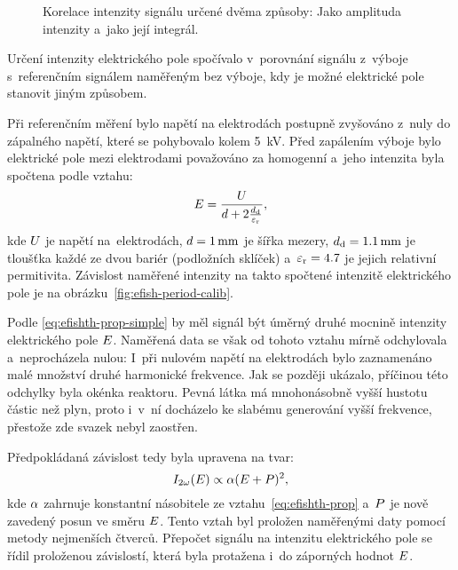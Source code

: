 \begin{figure}[htp]
	\centering
	
	\caption{Korelace intenzity signálu \EFISH{} určené dvěma způsoby:
		Jako amplituda intenzity a~jako její integrál.}
	\label{fig:efish-intmax}
\end{figure}

Určení intenzity elektrického pole spočívalo v~porovnání signálu
\EFISH{} z~výboje s~referenčním signálem naměřeným bez výboje,
kdy je možné elektrické pole stanovit jiným způsobem.

Při referenčním měření bylo napětí na elektrodách postupně zvyšováno
z~nuly do zápalného napětí, které se pohybovalo kolem \SI{5}{\kilo\volt}.
Před zapálením výboje bylo elektrické pole mezi elektrodami považováno
za homogenní a~jeho intenzita byla spočtena podle vztahu:
\begin{equation}
	E = \frac{U}
		{d + 2\frac{d_\text{d}}{\varepsilon_\text{r}}},
\end{equation}
kde $U$ je napětí na~elektrodách,
$d = \SI{1}{\milli\metre}$ je šířka mezery,
$d_\text{d} = \SI{1.1}{\milli\metre}$ je tloušťka každé ze dvou bariér
(podložních sklíček)
a~$\varepsilon_\text{r} = \num{4.7}$ je jejich relativní permitivita.
Závislost naměřené intenzity na takto spočtené intenzitě elektrického
pole je na obrázku~\ref{fig:efish-period-calib}.

Podle \eqref{eq:efishth-prop-simple} by měl signál \EFISH{} být úměrný
druhé mocnině intenzity elektrického pole $E$.
Naměřená data se však od tohoto vztahu mírně odchylovala a~neprocházela nulou:
I~při nulovém napětí na elektrodách bylo zaznamenáno malé množství
druhé harmonické frekvence.
Jak se později ukázalo, příčinou této odchylky byla okénka reaktoru.
Pevná látka má mnohonásobně vyšší hustotu částic než plyn,
proto i~v~ní docházelo ke slabému generování vyšší frekvence,
přestože zde svazek nebyl zaostřen.

Předpokládaná závislost tedy byla upravena na tvar:
\begin{equation}
	\label{eq:efish-prop}
	I_{2\omega}(E) \propto \alpha (E + P)^2,
\end{equation}
kde $\alpha$ zahrnuje konstantní násobitele
ze vztahu~\eqref{eq:efishth-prop}
a~$P$ je nově zavedený posun ve směru $E$.
Tento vztah byl proložen naměřenými daty pomocí metody nejmenších čtverců.
Přepočet signálu \EFISH{} na intenzitu elektrického pole se řídil
proloženou závislostí, která byla protažena i~do záporných hodnot $E$.

